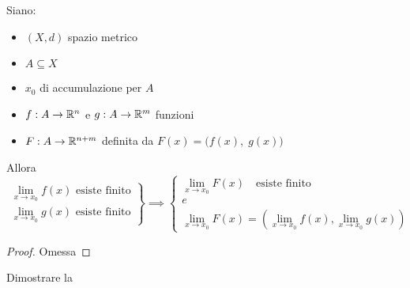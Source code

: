 \begin{proposition}
	\label{prop:lim_in_R_coord_F}
	Siano:
	\begin{itemize}[noitemsep]
		\item $(X,d)$ spazio metrico
		\item $A \subseteq X$
		\item $x_0$ di accumulazione per $A$
		\item $f: A \to \mathbb{R}^n$ e $g: A \to \mathbb{R}^m$ funzioni
		\item $F: A \to \mathbb{R}^{n+m}$ definita da $F(x) = \bigl( f(x),\; g(x) \bigr)$
	\end{itemize}
	Allora
	\begin{equation*}
		\left.
		\begin{array}{r}
			\lim\limits_{x \to x_0} f(x) \text{ esiste finito}\\
			\lim\limits_{x \to x_0} g(x) \text{ esiste finito}
		\end{array}
		\right\}
		\implies
		\left\{
		\begin{array}{c}
			\lim\limits_{x \to x_0} F(x) \quad \text{esiste finito}\\
			e\\
			\lim\limits_{x \to x_0} F(x) = \left( \lim\limits_{x \to x_0} f(x), \lim\limits_{x \to x_0} g(x) \right)
		\end{array}
		\right.
	\end{equation*}
	\begin{proof}
		Omessa
	\end{proof}
\end{proposition}
\begin{exercise}
	Dimostrare la 
\end{exercise}
\begin{exercise}
	\label{ex:se_fg_lips_max_fg_lips}
\end{exercise}
